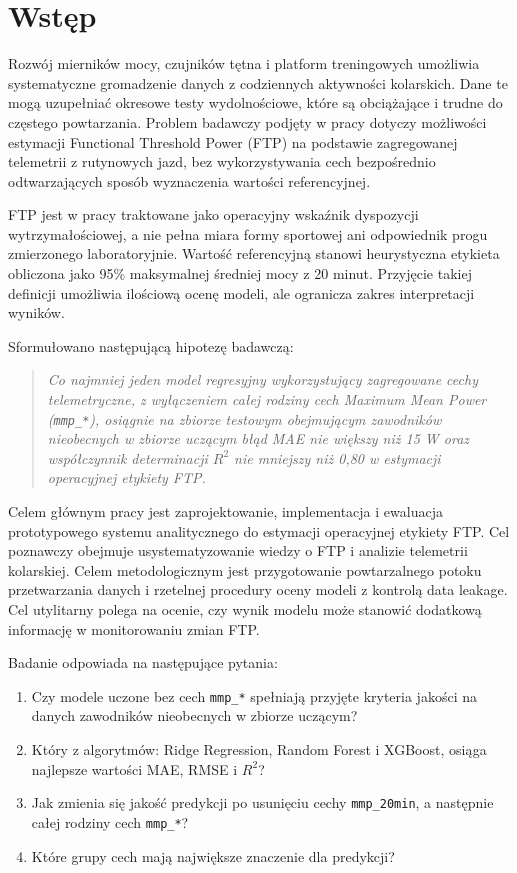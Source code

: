 \chapter*{Wstęp}

Rozwój mierników mocy, czujników tętna i platform treningowych umożliwia systematyczne gromadzenie danych z codziennych aktywności kolarskich. Dane te mogą uzupełniać okresowe testy wydolnościowe, które są obciążające i trudne do częstego powtarzania. Problem badawczy podjęty w pracy dotyczy możliwości estymacji Functional Threshold Power (FTP) na podstawie zagregowanej telemetrii z rutynowych jazd, bez wykorzystywania cech bezpośrednio odtwarzających sposób wyznaczenia wartości referencyjnej.

FTP jest w pracy traktowane jako operacyjny wskaźnik dyspozycji wytrzymałościowej, a nie pełna miara formy sportowej ani odpowiednik progu zmierzonego laboratoryjnie. Wartość referencyjną stanowi heurystyczna etykieta obliczona jako 95\% maksymalnej średniej mocy z 20 minut. Przyjęcie takiej definicji umożliwia ilościową ocenę modeli, ale ogranicza zakres interpretacji wyników.

Sformułowano następującą hipotezę badawczą:
\begin{quote}
    \textit{Co najmniej jeden model regresyjny wykorzystujący zagregowane cechy telemetryczne, z wyłączeniem całej rodziny cech Maximum Mean Power (\texttt{mmp\_*}), osiągnie na zbiorze testowym obejmującym zawodników nieobecnych w zbiorze uczącym błąd MAE nie większy niż 15 W oraz współczynnik determinacji $R^2$ nie mniejszy niż 0{,}80 w estymacji operacyjnej etykiety FTP.}
\end{quote}

Celem głównym pracy jest zaprojektowanie, implementacja i ewaluacja prototypowego systemu analitycznego do estymacji operacyjnej etykiety FTP. Cel poznawczy obejmuje usystematyzowanie wiedzy o FTP i analizie telemetrii kolarskiej. Celem metodologicznym jest przygotowanie powtarzalnego potoku przetwarzania danych i rzetelnej procedury oceny modeli z kontrolą data leakage. Cel utylitarny polega na ocenie, czy wynik modelu może stanowić dodatkową informację w monitorowaniu zmian FTP.

Badanie odpowiada na następujące pytania:
\begin{enumerate}
    \item Czy modele uczone bez cech \texttt{mmp\_*} spełniają przyjęte kryteria jakości na danych zawodników nieobecnych w zbiorze uczącym?
    \item Który z algorytmów: Ridge Regression, Random Forest i XGBoost, osiąga najlepsze wartości MAE, RMSE i $R^2$?
    \item Jak zmienia się jakość predykcji po usunięciu cechy \texttt{mmp\_20min}, a następnie całej rodziny cech \texttt{mmp\_*}?
    \item Które grupy cech mają największe znaczenie dla predykcji?
\end{enumerate}

